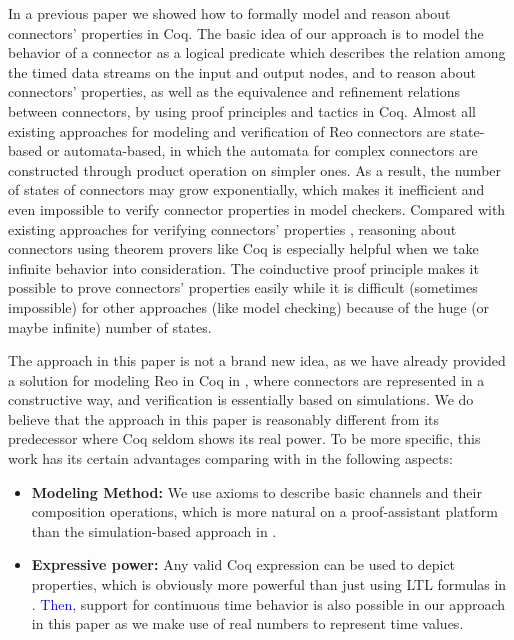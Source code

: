 \documentclass[preprint,3p]{elsarticle}
\newcommand{\liyi}[1]{\textcolor{blue}{#1}}
\newcommand{\xy}[1]{{#1}}
\begin{document}
In a previous paper \cite{ZHL+17} we showed how to formally model and reason about connectors' properties in Coq. The basic idea of our approach is to model the behavior of \xy{a connector as a logical predicate} which describes the relation among the timed data streams on the input and output nodes, and to reason about connectors' properties, as well as the equivalence and refinement relations between connectors, by using proof principles and tactics in Coq. \xy{Almost all existing approaches for modeling and verification of Reo connectors are state-based or automata-based, in which the automata for complex connectors are constructed through product operation on simpler ones. As a result, the number of states of connectors  may grow exponentially, which makes it inefficient and even impossible to verify connector properties in model checkers. Compared with existing approaches for verifying connectors' properties \cite{BBK+10,KB09,KKV12}, reasoning about connectors using theorem provers like Coq is especially helpful when we take infinite behavior into consideration. The coinductive proof principle makes it possible to prove connectors' properties easily while it is difficult (sometimes impossible) for other approaches (like model checking) because of the huge (or maybe infinite) number of states.}

The approach in this paper is not a brand new idea, as we have already provided a solution for modeling Reo in Coq in \cite{LS15}, where connectors are represented in a constructive way, and verification is essentially based on simulations. We do believe that the approach in this paper is reasonably different from its predecessor \cite{LS15} where Coq seldom shows its real power. To be more specific, this work has its certain
advantages comparing with \cite{LS15} in the following aspects:
\begin{itemize}
\item {\bf Modeling Method:} We use axioms to describe basic channels and their composition operations, which is more natural on a proof-assistant platform than the simulation-based approach in \cite{LS15}.
\item {\bf Expressive power:} Any valid Coq expression can be used to depict properties, which is obviously more powerful than just using LTL formulas in \cite{LS15}. \liyi{Then}, \xy{support for continuous time behavior is also possible in our approach in this paper as we make use of real numbers to represent time values.}
\end{itemize}
\end{document}
